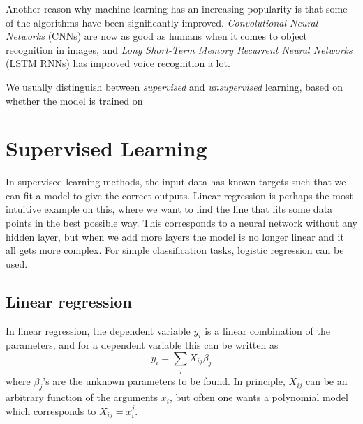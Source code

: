Another reason why machine learning has an increasing popularity is that some of the algorithms have been significantly improved. \textit{Convolutional Neural Networks} (CNNs) are now as good as humans when it comes to object recognition in images, and \textit{Long Short-Term Memory Recurrent Neural Networks} (LSTM RNNs) has improved voice recognition a lot. 

We usually distinguish between \textit{supervised} and \textit{unsupervised} learning, based on whether the model is trained on 

\section{Supervised Learning}
In supervised learning methods, the input data has known targets such that we can fit a model to give the correct outputs. Linear regression is perhaps the most intuitive example on this, where we want to find the line that fits some data points in the best possible way. This corresponds to a neural network without any hidden layer, but when we add more layers the model is no longer linear and it all gets more complex. For simple classification tasks, logistic regression can be used. 

\subsection{Linear regression}
In linear regression, the dependent variable $y_i$ is a linear combination of the parameters, and for a dependent variable this can be written as
\begin{equation}
y_i=\sum_jX_{ij}\beta_j
\end{equation}
where $\beta_j$'s are the unknown parameters to be found. In principle, $X_{ij}$ can be an arbitrary function of the arguments $x_i$, but often one wants a polynomial model which corresponds to $X_{ij} = x_i^j$.

